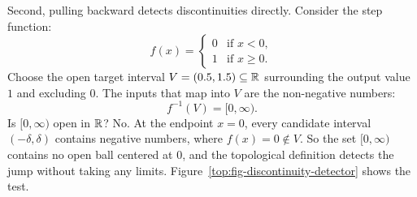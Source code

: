 Second, pulling backward detects discontinuities directly. Consider the step function:
\[
f(x) = \begin{cases} 0 & \text{if } x < 0, \\ 1 & \text{if } x \ge 0. \end{cases}
\]
Choose the open target interval $V = (0.5, 1.5) \subseteq \mathbb{R}$ surrounding the output value $1$ and excluding $0$. The inputs that map into $V$ are the non-negative numbers:
\[
f^{-1}(V) = [0, \infty).
\]
Is $[0, \infty)$ open in $\mathbb{R}$? No. At the endpoint $x = 0$, every candidate interval $(-\delta, \delta)$ contains negative numbers, where $f(x) = 0 \notin V$. So the set $[0, \infty)$ contains no open ball centered at $0$, and the topological definition detects the jump without taking any limits. Figure~\ref{top:fig-discontinuity-detector} shows the test.

